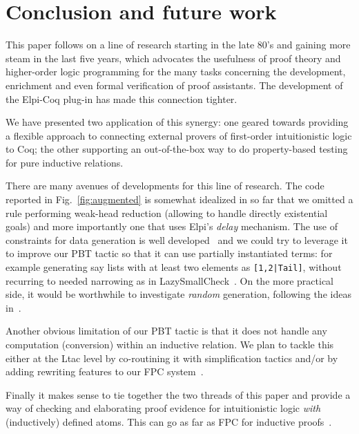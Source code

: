 \section{Conclusion and future work}

This paper follows on a line of research starting in the late 80's and
gaining more steam in the last five years, which advocates the
usefulness of proof theory and higher-order logic programming for the
many tasks concerning the development, enrichment and even formal
verification of proof assistants. The development of the Elpi-Coq
plug-in has made this connection tighter.

We have presented two application of this synergy: one geared towards
providing a flexible approach to connecting external provers of
first-order intuitionistic logic to Coq; the other supporting an out-of-the-box way to do property-based testing for pure inductive relations.
%


There are many avenues of developments for this line of research.
The code reported in Fig.~\ref{fig:augmented} is somewhat idealized in
so far that we omitted a rule performing weak-head reduction (allowing
to handle directly existential goals) and more importantly one that uses
 Elpi's \emph{delay} mechanism. %
The
use of constraints for data generation is well
developed~\cite{FioravantiPS15} and we could try to leverage it to
improve our PBT tactic so that it can use partially instantiated terms: for example generating
say lists with at least two elements as \texttt{[1,2|Tail]}, without
recurring to needed narrowing as in 
LazySmallCheck~\cite{smallcheck}. On the more practical side, it would be worthwhile to investigate \emph{random} generation, following the ideas in~\cite{pltredexconstraintlogic,blanco19ppdp}.

Another obvious limitation of our PBT tactic is that it does not 
 handle any computation (conversion) within an inductive relation. We plan to tackle this either at the Ltac level by co-routining it with simplification tactics and/or by adding rewriting features to our FPC system~\cite{ChihaniM16}.

 Finally it makes sense to tie together the two threads of this paper
 and provide a way of checking and elaborating proof evidence for
 intuitionistic logic \emph{with} (inductively) defined atoms. This
 can go as far as FPC for inductive proofs~\cite{blanco15wof}.

